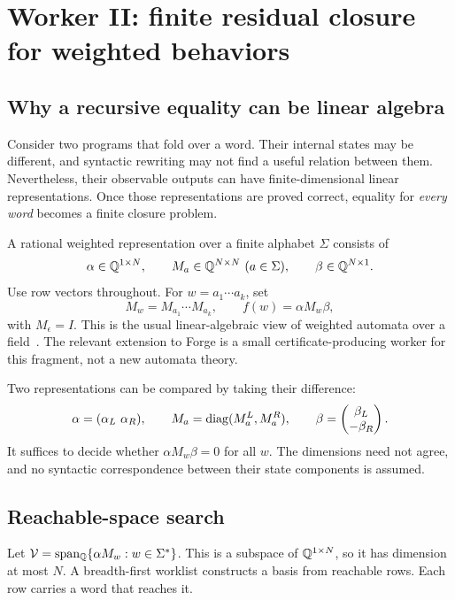 \section{Worker II: finite residual closure for weighted behaviors}
\label{sec:weighted}

\subsection{Why a recursive equality can be linear algebra}

Consider two programs that fold over a word. Their internal states may be
different, and syntactic rewriting may not find a useful relation between them.
Nevertheless, their observable outputs can have finite-dimensional linear
representations. Once those representations are proved correct, equality for
\emph{every word} becomes a finite closure problem.

A rational weighted representation over a finite alphabet $\Sigma$ consists of
\[
 \alpha\in\mathbb{Q}^{1\times N},\qquad M_a\in\mathbb{Q}^{N\times N}\ (a\in\Sigma),
 \qquad\beta\in\mathbb{Q}^{N\times1}.
\]
Use row vectors throughout. For $w=a_1\cdots a_k$, set
\[
 M_w=M_{a_1}\cdots M_{a_k},\qquad
 f(w)=\alpha M_w\beta,
\]
with $M_\epsilon=I$. This is the usual linear-algebraic view of weighted
automata over a field~\cite{kiefer,tzeng}. The relevant extension to Forge is a
small certificate-producing worker for this fragment, not a new automata
theory.

Two representations can be compared by taking their difference:
\begin{equation}
 \alpha=(\alpha_L\ \alpha_R),\qquad
 M_a=\operatorname{diag}(M^L_a,M^R_a),\qquad
 \beta=\begin{pmatrix}\beta_L\\-\beta_R\end{pmatrix}.
 \label{eq:weighted-difference}
\end{equation}
It suffices to decide whether $\alpha M_w\beta=0$ for all $w$. The dimensions
need not agree, and no syntactic correspondence between their state components
is assumed.

\subsection{Reachable-space search}

Let $\mathcal V=\operatorname{span_{\mathbb{Q}}}\{\alpha M_w:w\in\Sigma^*\}$. This is a subspace of
$\mathbb{Q}^{1\times N}$, so it has dimension at most $N$. A breadth-first worklist
constructs a basis from reachable rows. Each row carries a word that reaches
it.

